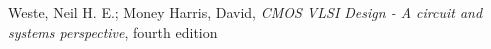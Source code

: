 
\begin{thebibliography}{Sempronio, 2004}
	 Weste, Neil H. E.; Money Harris, David, \emph{CMOS VLSI Design - A circuit and systems perspective}, fourth edition
\end{thebibliography}